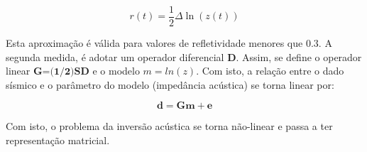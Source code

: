 \begin{equation}
r(t) = \frac{1}{2}\Delta \ln(z(t))
\label{eq:lnz}
\end{equation}

Esta aproximação é válida para valores de refletividade menores que $0.3$.
A segunda medida, é adotar um operador diferencial $\textbf{D}$. Assim,
se define o operador linear $\textbf{G=(1/2)SD}$ e o modelo $m=ln(z)$.
Com isto, a relação entre o dado sísmico e o parâmetro do modelo (impedância acústica)
se torna linear por:

\begin{equation}
\label{eq:sismDiscreta}
\mathbf{d = Gm + e}
\end{equation}

Com isto, o problema da inversão acústica se torna não-linear e passa a ter representação matricial.

